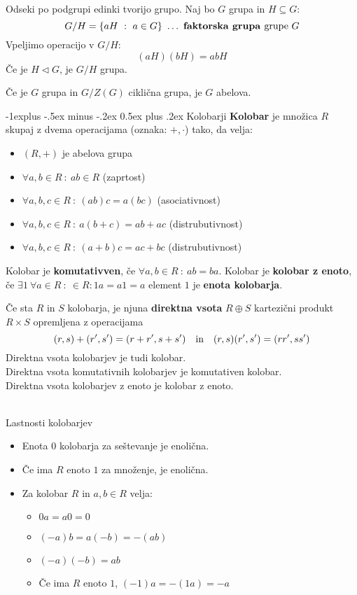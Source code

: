 \documentclass[a4paper,9pt]{extarticle}
\makeatletter
\renewcommand{\subsection}{\@startsection{subsection}{2}{0mm}%
                                {-1explus -.5ex minus -.2ex}%
                                {0.5ex plus .2ex}%
                                {\normalfont\normalsize\bfseries}}
\makeatother
\begin{document}
\begin{multicols}{3}
Odseki po podgrupi edinki tvorijo grupo. Naj bo $G$ grupa in $H\subseteq G$:
\[G/H = \left\{ aH\ :\ a \in G \right\}\ \dots\ \textbf{faktorska grupa }\textmd{grupe }G\]
Vpeljimo operacijo v $G/H$:
\[(aH)(bH) = abH\]
Če je $H \lhd G$, je $G/H$ grupa.

Če je $G$ grupa in $G/Z(G)$ ciklična grupa, je $G$ abelova.

\subsection{Kolobarji}
\textbf{Kolobar} je množica $R$ skupaj z dvema operacijama (oznaka: $+, \cdot$) tako, da velja:
\begin{itemize}
    \item $(R, +)$ je abelova grupa
    \item $\forall a, b \in R\ :\ ab \in R$ (zaprtost)
    \item $\forall a, b, c \in R\ :\ (ab)c = a(bc)$ (asociativnost)
    \item $\forall a, b, c \in R\ :\ a(b+c) = ab + ac$ (distrubutivnost)
    \item $\forall a, b, c \in R\ :\ (a+b)c = ac + bc$ (distrubutivnost)
\end{itemize}
Kolobar je \textbf{komutativven}, če $\forall a, b \in R\ :\ ab = ba$.
Kolobar je \textbf{kolobar z enoto}, če $\exists 1\ \forall a \in R\ :\ \in R : 1a = a1 = a$ element $1$ je \textbf{enota kolobarja}.

Če sta $R$ in $S$ kolobarja, je njuna \textbf{direktna vsota} $R \oplus S$ kartezični produkt $R \times S$ opremljena z operacijama
\[(r,s) + (r',s') = (r+r',s+s') \quad \textmd{in} \quad (r,s)(r',s') = (rr',ss')\]
Direktna vsota kolobarjev je tudi kolobar. \\
Direktna vsota komutativnih kolobarjev je komutativen kolobar.\\
Direktna vsota kolobarjev z enoto je kolobar z enoto.\\\

Lastnosti kolobarjev
\begin{itemize}
    \item Enota $0$ kolobarja za seštevanje je enolična.
    \item Če ima $R$ enoto $1$ za množenje, je enolična.
    \item Za kolobar $R$ in $a, b \in R$ velja:
    \begin{itemize}
        \item $0a = a0 = 0$
        \item $(-a)b = a(-b) = -(ab)$
        \item $(-a)(-b) = ab$
        \item Če ima $R$ enoto $1$, $(-1)a = -(1a) = -a$
    \end{itemize}
\end{itemize}


\end{multicols}
\end{document}
